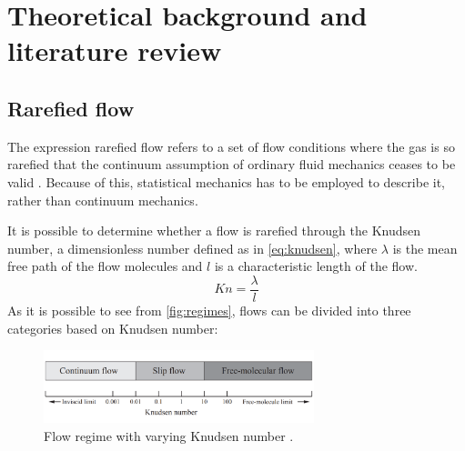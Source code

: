 \section{Theoretical background and literature review}
\label{section:2}

\subsection{Rarefied flow}
The expression rarefied flow refers to a set of flow conditions where the gas is so rarefied that the continuum assumption of ordinary fluid mechanics ceases to be valid \cite{aerothermonotes}. Because of this, statistical mechanics has to be employed to describe it, rather than continuum mechanics.

It is possible to determine whether a flow is rarefied through the Knudsen number, a dimensionless number defined as in \autoref{eq:knudsen}, where $\lambda$ is the mean free path of the flow molecules and $l$ is a characteristic length of the flow.
\begin{equation}
    Kn=\frac{\lambda}{l}
    \label{eq:knudsen}
\end{equation}
As it is possible to see from \autoref{fig:regimes}, flows can be divided into three categories based on Knudsen number:
\begin{figure}[ht]
    \centering
    \includegraphics[width=0.7\textwidth]{../Images/2. Background/regimes.png}
    \caption{Flow regime with varying Knudsen number \cite{aerothermonotes}.}
    \label{fig:regimes}
\end{figure}
